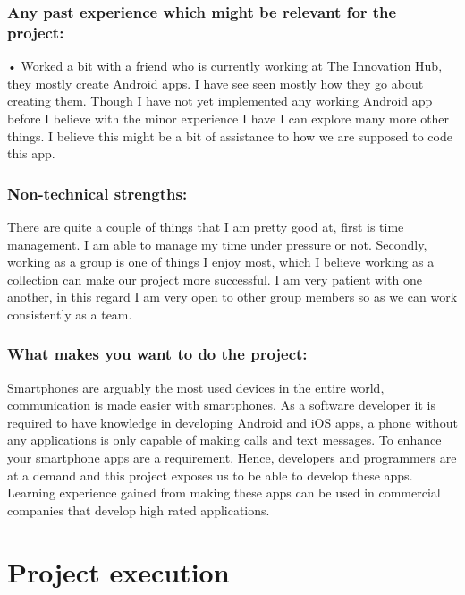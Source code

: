 \documentclass[12pt]{article}
\begin{document}
\begin{description}
	 \subsubsection{Any past experience which might be relevant for the project:}
	 
	 • Worked a bit with a friend who is currently working at The Innovation Hub, they mostly create Android apps. I have see seen mostly how they go about creating them. Though I have not yet implemented any working Android app before I believe with the minor experience I have I can explore many more other things. I believe this might be a bit of assistance to how we are supposed to code this app.
	 
	 \subsubsection{Non-technical strengths:}
	 
	 There are quite a couple of things that I am pretty good at, first is time management. I am able to manage my time under pressure or not. Secondly, working as a group is one of things I enjoy most, which I believe working as a collection can make our project more successful. I am very patient with one another, in this regard I am very open to other group members so as we can work consistently as a team.
	 
	 \subsubsection{What makes you want to do the project:}
	
	Smartphones are arguably the most used devices in the entire world, communication is made easier with smartphones. As a software developer it is required to have knowledge in developing Android and iOS apps, a phone without any applications is only capable of making calls and text messages. To enhance your smartphone apps are a requirement. Hence, developers and programmers are at a demand and this project exposes us to be able to develop these apps. Learning experience gained from making these apps can be used in commercial companies that develop high rated applications. 
	
	
	\end{description}
	

\section{Project execution}
\end{document}

